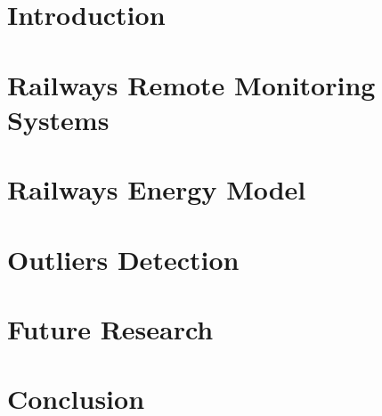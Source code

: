 \documentclass[11pt,a4paper,twoside,openright]{report}
\begin{document}




\begin{Prolog}
\cleardoublepage

\tableofcontents



%

	
\end{Prolog}

\StartBody

\chapter{Introduction}



\chapter{Railways Remote Monitoring Systems}



\chapter{Railways Energy Model}


\chapter{Outliers Detection}


\chapter{Future Research}


\chapter{Conclusion}







%


%
%
\end{document}
